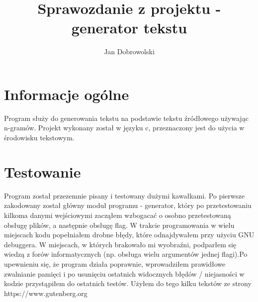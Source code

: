 \documentclass{article}
\author{Jan Dobrowolski}
\title{Sprawozdanie z projektu - generator tekstu}
\begin{document}
\maketitle
\section{Informacje ogólne}
Program służy do generowania tekstu na podstawie tekstu źródłowego używając n-gramów. Projekt wykonany został w języku c, przeznaczony jest do użycia w środowisku tekstowym.
\section{Testowanie}
Program został przezemnie pisany i testowany dużymi kawałkami. Po pierwsze zakodowany został główny moduł programu - generator, który po przetestowaniu kilkoma danymi wejściowymi zacząłem wzbogacać o osobno przetestowaną obsługę plików, a następnie obsługę flag. W trakcie programowania w wielu miejscach kodu popełniałem drobne błędy, które odnajdywałem przy użyciu GNU debuggera. W miejscach, w których brakowało mi wyobraźni, podparłem się wiedzą z forów informatycznych (np. obsługa wielu argumentów jednej flagi).Po upewnieniu się, że program działa poprawnie, wprowadziłem prawidłowe zwalnianie pamięci i po usunięciu ostatnich widocznych błędów / niejasności w kodzie przystąpiłem do ostatnich testów. Użyłem do tego kilku tekstów ze strony https://www.gutenberg.org
\end{document}
